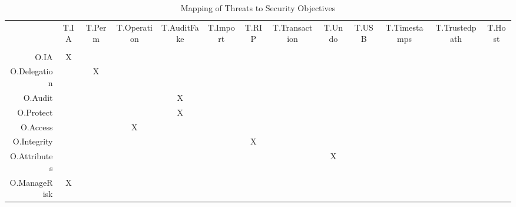 \documentclass[10pt,a4paper,english]{scrbook}
\begin{document}
\begin{table}
  \begin{tabular}{rcccccccccccc}
             & T.IA  & T.Perm &T.Operation&T.AuditFake&T.Import  & T.RIP&T.Transaction&T.Undo &  T.USB&T.Timestamps &  T.Trustedpath & T.Host \\
             &       &       &            &            &         &      &             &       &       &             &                 &       \\ 
O.IA         &   X   &       &            &            &         &      &             &       &       &             &                 &       \\
O.Delegation &       &    X  &            &            &         &      &             &       &       &             &                 &        \\
O.Audit      &       &       &            &     X      &         &      &             &       &       &             &                 &        \\
O.Protect    &       &       &            &     X      &         &      &             &       &       &             &                 &        \\
O.Access     &       &       &       X    &            &         &      &             &       &       &             &                 &        \\
O.Integrity  &       &       &            &            &         &    X &             &       &       &             &                 &        \\
O.Attributes &       &       &            &            &         &      &             &    X  &       &             &                 &        \\
O.ManageRisk &   X   &       &            &            &         &      &             &       &       &             &                 &        \\
  \end{tabular}
  \caption{Mapping of Threats to Security Objectives}
\end{table}

\begin{quote}
\begin{quote}

\end{quote}

\end{quote}


\end{document}
